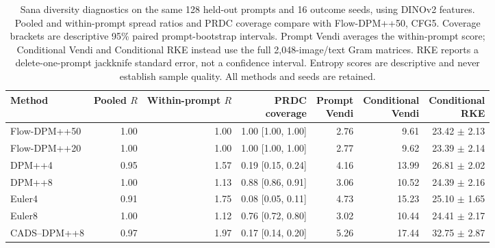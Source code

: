 \begin{table}[t]
\centering\footnotesize
\setlength{\tabcolsep}{4pt}
\begin{tabular}{lrrrrrr}
\toprule
Method & \shortstack{Pooled\\$R$} & \shortstack{Within-prompt\\$R$} & \shortstack{PRDC\\coverage} & \shortstack{Prompt\\Vendi} & \shortstack{Conditional\\Vendi} & \shortstack{Conditional\\RKE} \\
\midrule
Flow-DPM++50 & 1.00 & 1.00 & 1.00 [1.00, 1.00] & 2.76 & 9.61 & 23.42 $\pm$ 2.13 \\
Flow-DPM++20 & 1.00 & 1.00 & 1.00 [1.00, 1.00] & 2.77 & 9.62 & 23.39 $\pm$ 2.14 \\
DPM++4 & 0.95 & 1.57 & 0.19 [0.15, 0.24] & 4.16 & 13.99 & 26.81 $\pm$ 2.02 \\
DPM++8 & 1.00 & 1.13 & 0.88 [0.86, 0.91] & 3.06 & 10.52 & 24.39 $\pm$ 2.16 \\
Euler4 & 0.91 & 1.75 & 0.08 [0.05, 0.11] & 4.73 & 15.23 & 25.10 $\pm$ 1.65 \\
Euler8 & 1.00 & 1.12 & 0.76 [0.72, 0.80] & 3.02 & 10.44 & 24.41 $\pm$ 2.17 \\
CADS--DPM++8 & 0.97 & 1.97 & 0.17 [0.14, 0.20] & 5.26 & 17.44 & 32.75 $\pm$ 2.87 \\
\bottomrule
\end{tabular}
\caption{Sana diversity diagnostics on the same 128 held-out prompts and 16 outcome seeds, using DINOv2 features. Pooled and within-prompt spread ratios and PRDC coverage compare with Flow-DPM++50, CFG5. Coverage brackets are descriptive 95\% paired prompt-bootstrap intervals. Prompt Vendi averages the within-prompt score; Conditional Vendi and Conditional RKE instead use the full 2,048-image/text Gram matrices. RKE reports a delete-one-prompt jackknife standard error, not a confidence interval. Entropy scores are descriptive and never establish sample quality. All methods and seeds are retained.}
\label{tab:flow_test_competing_diagnostics}
\end{table}

